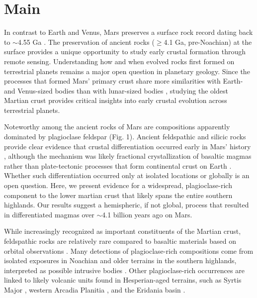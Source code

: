 \documentclass[11pt]{article}
\begin{document}
\section*{Main}

In contrast to Earth and Venus, Mars preserves a surface rock record dating back to $\sim$4.55 Ga \citep{Humayun2013, Kruijer2020}. The preservation of ancient rocks ($\geq$4.1 Ga, pre-Noachian) at the surface provides a unique opportunity to study early crustal formation through remote sensing. Understanding how and when evolved rocks first formed on terrestrial planets remains a major open question in planetary geology. Since the processes that formed Mars' primary crust share more similarities with Earth- and Venus-sized bodies than with lunar-sized bodies \citep{Elkins-Tanton2012}, studying the oldest Martian crust provides critical insights into early crustal evolution across terrestrial planets.

Noteworthy among the ancient rocks of Mars are compositions apparently dominated by plagioclase feldspar (Fig. 1). Ancient feldspathic and silicic rocks provide clear evidence that crustal differentiation occurred early in Mars' history \citep[e.g.,][]{Stolper2013, Sautter2015}, although the mechanism was likely fractional crystallization of basaltic magmas rather than plate-tectonic processes that form continental crust on Earth \citep{Udry2018}. Whether such differentiation occurred only at isolated locations or globally is an open question. Here, we present evidence for a widespread, plagioclase-rich component to the lower martian crust that likely spans the entire southern highlands. Our results suggest a hemispheric, if not global, process that resulted in differentiated magmas over $\sim$4.1 billion years ago on Mars.

While increasingly recognized as important constituents of the Martian crust, feldspathic rocks are relatively rare compared to basaltic materials based on orbital observations \citep{McSween2009, McSween2015, McSween2023}. Many detections of plagioclase-rich compositions come from isolated exposures in Noachian and older terrains in the southern highlands, interpreted as possible intrusive bodies \citep{Quantin2012, Carter2013, Wray2013, Sautter2016, Payre2022}. Other plagioclase-rich occurrences are linked to likely volcanic units found in Hesperian-aged terrains, such as Syrtis Major \citep{Eggers2021}, western Arcadia Planitia \citep{Farrand2021, Rogers2022}, and the Eridania basin \citep{Michalski2023}.
\end{document}
